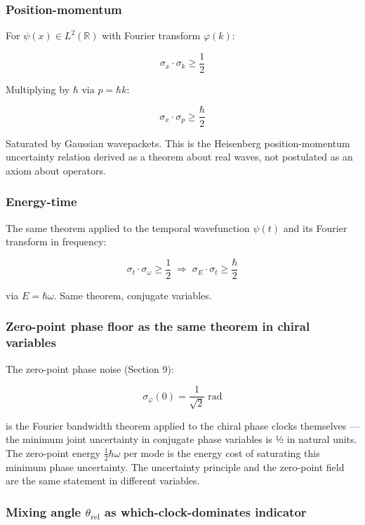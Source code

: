\documentclass[
]{article}
\begin{document}
\subsubsection{Position-momentum}\label{position-momentum}

For \(\psi(x) \in L^2(\mathbb{R})\) with Fourier transform
\(\varphi(k)\):

\[\sigma_x \cdot \sigma_k \geq \frac{1}{2}\]

Multiplying by \(\hbar\) via \(p = \hbar k\):

\[\boxed{\sigma_x \cdot \sigma_p \geq \frac{\hbar}{2}}\]

Saturated by Gaussian wavepackets. This is the Heisenberg
position-momentum uncertainty relation derived as a theorem about real
waves, not postulated as an axiom about operators.

\subsubsection{Energy-time}\label{energy-time}

The same theorem applied to the temporal wavefunction \(\psi(t)\) and
its Fourier transform in frequency:

\[\sigma_t \cdot \sigma_\omega \geq \frac{1}{2} \;\Longrightarrow\; \boxed{\sigma_E \cdot \sigma_t \geq \frac{\hbar}{2}}\]

via \(E = \hbar\omega\). Same theorem, conjugate variables.

\subsubsection{Zero-point phase floor as the same theorem in chiral
variables}\label{zero-point-phase-floor-as-the-same-theorem-in-chiral-variables}

The zero-point phase noise (Section 9):

\[\sigma_\varphi(0) = \frac{1}{\sqrt{2}}\;\text{rad}\]

is the Fourier bandwidth theorem applied to the chiral phase clocks
themselves --- the minimum joint uncertainty in conjugate phase
variables is ½ in natural units. The zero-point energy
\(\tfrac{1}{2}\hbar\omega\) per mode is the energy cost of saturating
this minimum phase uncertainty. The uncertainty principle and the
zero-point field are the same statement in different variables.

\subsubsection{\texorpdfstring{Mixing angle \(\theta_{\text{rel}}\) as
which-clock-dominates
indicator}{Mixing angle \textbackslash theta\_\{\textbackslash text\{rel\}\} as which-clock-dominates indicator}}\label{mixing-angle-theta_textrel-as-which-clock-dominates-indicator}
\end{document}
